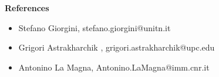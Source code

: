 \documentclass[11pt,a4paper,sans]{article}
\begin{document}
 \textbf{ References}



\begin{itemize}
\item Stefano Giorgini, stefano.giorgini@unitn.it
\item Grigori Astrakharchik , grigori.astrakharchik@upc.edu
\item Antonino La Magna, Antonino.LaMagna@imm.cnr.it
\end{itemize}
\end{document}
